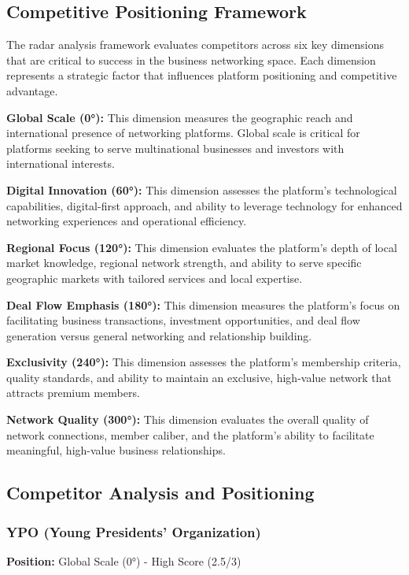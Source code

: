 \subsection{Competitive Positioning Framework}

The radar analysis framework evaluates competitors across six key dimensions that are critical to success in the business networking space. Each dimension represents a strategic factor that influences platform positioning and competitive advantage.

\textbf{Global Scale (0°):} This dimension measures the geographic reach and international presence of networking platforms. Global scale is critical for platforms seeking to serve multinational businesses and investors with international interests.

\textbf{Digital Innovation (60°):} This dimension assesses the platform's technological capabilities, digital-first approach, and ability to leverage technology for enhanced networking experiences and operational efficiency.

\textbf{Regional Focus (120°):} This dimension evaluates the platform's depth of local market knowledge, regional network strength, and ability to serve specific geographic markets with tailored services and local expertise.

\textbf{Deal Flow Emphasis (180°):} This dimension measures the platform's focus on facilitating business transactions, investment opportunities, and deal flow generation versus general networking and relationship building.

\textbf{Exclusivity (240°):} This dimension assesses the platform's membership criteria, quality standards, and ability to maintain an exclusive, high-value network that attracts premium members.

\textbf{Network Quality (300°):} This dimension evaluates the overall quality of network connections, member caliber, and the platform's ability to facilitate meaningful, high-value business relationships.

\subsection{Competitor Analysis and Positioning}

\subsubsection{YPO (Young Presidents' Organization)}
\textbf{Position:} Global Scale (0°) - High Score (2.5/3)

